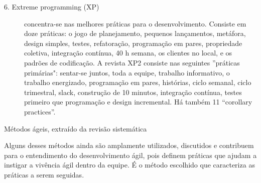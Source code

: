 \begin{mdframed}
\begin{description}
\item [6. Extreme programming (XP)]
concentra-se nas melhores práticas para o desenvolvimento.  Consiste em doze práticas: o jogo de planejamento, pequenos lançamentos,  metáfora, design simples, testes, refatoração, programação em pares,  propriedade coletiva, integração contínua, 40 h semana, os clientes no local,  e os padrões de codificação. A revista XP2 consiste nas seguintes  ''práticas primárias": sentar-se juntos, toda a equipe, trabalho informativo,  o trabalho energizado, programação em pares, histórias, ciclo semanal,  ciclo trimestral, slack, construção de 10 minutos, integração contínua,  testes primeiro que programação e design incremental.  Há também 11 ``corollary practices''.
\end{description}
\end{mdframed}
\begin{flushright}
Métodos ágeis, extraído da revisão sistemática ~\cite{dyba2008}
\end{flushright}

Alguns desses métodos ainda são amplamente utilizados, discutidos e contribuem para o entendimento do desenvolvimento ágil, pois definem práticas que ajudam a instigar a vivência ágil dentro da equipe. É o método escolhido que caracteriza as práticas a serem seguidas.

